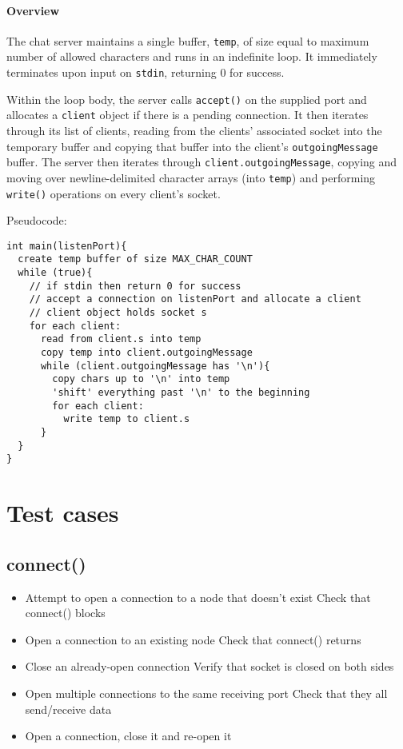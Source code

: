 \documentclass[]{article}
\begin{document}
\paragraph{Overview}
The chat server maintains a single buffer, \texttt{temp}, of size equal to maximum number of allowed characters and runs in an indefinite loop. It immediately terminates upon input on \texttt{stdin}, returning 0 for success.

Within the loop body, the server calls \texttt{accept()} on the supplied port and allocates a \texttt{client} object if there is a pending connection. It then iterates through its list of clients, reading from the clients' associated socket into the temporary buffer and copying that buffer into the client's \texttt{outgoingMessage} buffer. The server then iterates through \texttt{client.outgoingMessage}, copying and moving over newline-delimited character arrays (into \texttt{temp}) and performing \texttt{write()} operations on every client's socket.

\pagebreak

\noindent Pseudocode:

\begin{lstlisting}
int main(listenPort){
  create temp buffer of size MAX_CHAR_COUNT
  while (true){
    // if stdin then return 0 for success
    // accept a connection on listenPort and allocate a client
    // client object holds socket s
    for each client:
      read from client.s into temp
      copy temp into client.outgoingMessage
      while (client.outgoingMessage has '\n'){
        copy chars up to '\n' into temp
        'shift' everything past '\n' to the beginning
        for each client:
          write temp to client.s
      }
  }
}	
\end{lstlisting}

\section{Test cases}
\subsection{connect()}
\begin{itemize}
	\item Attempt to open a connection to a node that doesn't exist
	\subitem Check that connect() blocks
	\item Open a connection to an existing node
	\subitem Check that connect() returns
	\item Close an already-open connection
	\subitem Verify that socket is closed on both sides
	\item Open multiple connections to the same receiving port
	\subitem Check that they all send/receive data
	\item Open a connection, close it and re-open it
\end{itemize}
\end{document}
